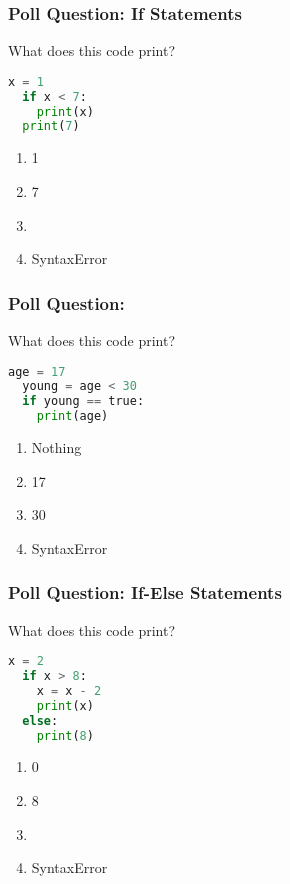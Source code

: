 \documentclass{beamer}
\begin{document}
%
%
\begin{frame}[fragile]
  \frametitle{Poll Question: If Statements}
  What does this code print?
  \begin{lstlisting}[language=Python, autogobble]
  x = 1
  if x < 7:
    print(x) 
  print(7)
  \end{lstlisting}
  \vfill
  \begin{enumerate}[A]
    \item 1
    \item 7
    \item {}
    \item SyntaxError
  \end{enumerate}
\end{frame}

%
%
\begin{frame}[fragile]
  \frametitle{Poll Question: }
  What does this code print?
  \begin{lstlisting}[language=Python, autogobble]
  age = 17
  young = age < 30
  if young == true:
    print(age)
  \end{lstlisting}
  \vfill
  \begin{enumerate}[A]
    \item Nothing
    \item 17
    \item 30
    \item SyntaxError
  \end{enumerate}
\end{frame}

%
%
\begin{frame}[fragile]
  \frametitle{Poll Question: If-Else Statements}
  What does this code print?
  \begin{lstlisting}[language=Python, autogobble]
  x = 2
  if x > 8:
    x = x - 2
    print(x)
  else:
    print(8)
  \end{lstlisting}
  \vfill
  \begin{enumerate}[A]
    \item 0
    \item 8
    \item {}
    \item SyntaxError
  \end{enumerate}
\end{frame}
\end{document}
